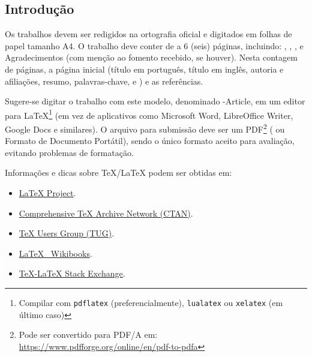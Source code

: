 \documentclass[%
  a4paper,%
  12pt,%
  fleqn,%
  english,%
  brazilian,%
]{article}
\begin{document}
\begin{OverleafFreePlan}

% 

\section{Introdução}%
\label{sect:intro}

Os trabalhos devem ser redigidos na ortografia oficial e digitados em folhas de papel tamanho A4.
O trabalho deve conter de  a 6 (seis) páginas, incluindo: , , ,  e Agradecimentos (com menção ao fomento recebido, se houver).
Nesta contagem de páginas,  a página inicial (título em português, título em inglês, autoria e afiliações, resumo, palavras-chave,  e ) e as referências.

Sugere-se digitar o trabalho com este modelo, denominado \UTFPR-Article, em um editor para \LaTeX{}\footnote{Compilar com \texttt{pdflatex} (preferencialmente), \texttt{lualatex} ou \texttt{xelatex} (em último caso)} (em vez de aplicativos como Microsoft\textsuperscript{\textregistered} Word\textsuperscript{\textregistered}, LibreOffice\textsuperscript{\textregistered} Writer, Google Docs e similares).
O arquivo para submissão deve ser um PDF\footnote{Pode ser convertido para PDF/A em: \url{https://www.pdfforge.org/online/en/pdf-to-pdfa}} ( ou Formato de Documento Portátil), sendo o único formato aceito para avaliação, evitando problemas de formatação.

Informações e dicas sobre \TeX{}/\LaTeX{} podem ser obtidas em:

\begin{itemize}
\item \href{https://www.latex-project.org/}{\LaTeX{} Project\LinkIcon}.
\item \href{https://www.ctan.org/}{Comprehensive \TeX{} Archive Network (CTAN)\LinkIcon}.
\item \href{https://www.tug.org/}{\TeX{} Users Group (TUG)\LinkIcon}.
\item \href{https://en.wikibooks.org/wiki/LaTeX/}{\LaTeX{} \textemdash\ Wikibooks\LinkIcon}.
\item \href{https://tex.stackexchange.com/}{\TeX{}-\LaTeX{} Stack Exchange\LinkIcon}.
\end{itemize}


\end{OverleafFreePlan}
\end{document}
